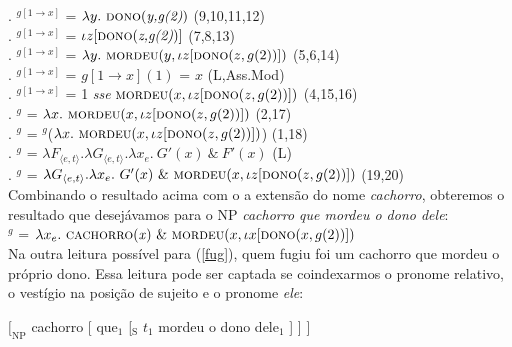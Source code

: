. $^{g[1 \rightarrow x]}$ = $\lambda y.\ \text{\textsc{dono}(\textit{y,g(2)})}$ \hfill (9,10,11,12)\\

. $^{g[1 \rightarrow x]}$ = $\iota z[\text{\textsc{dono}(\textit{z,g(2)})}]$ \hfill (7,8,13)\\

. $^{g[1 \rightarrow x]}$ =
$\lambda y.\ \textsc{mordeu}(y,\iota z[\textsc{dono}(z,g(2))])$ \hfill (5,6,14)\\

. $^{g[1 \rightarrow x]}$ = $g[1 \rightarrow x](1)$ = $x$ \hfill (L,Ass.Mod)\\

. $^{g[1 \rightarrow x]}$ = 1 \textit{sse} $\textsc{mordeu}(x,\iota z[\textsc{dono}(z,g(2))])$ \hfill (4,15,16)\\

. $^{g}$ = $\lambda x.\ \textsc{mordeu}(x,\iota z[\textsc{dono}(z,g(2))])$ \hfill (2,17)\\

. $^{g}$ = $^{g}$($\lambda x.\ \textsc{mordeu}(x,\iota z[\textsc{dono}(z,g(2))])$) \hfill (1,18)\\

. $^{g}$ = $\lambda F_{\langle e,t\rangle}.\lambda
G_{\langle e,t\rangle}.\lambda x_{e}.\ G'(x)\ \&\ F'(x)$
\hfill (L)\\

. $^{g}$ = $\lambda G_{\langle e,t\rangle}.\lambda
x_{e}.\ G'(x)\ \&\ \textsc{mordeu}(x,\iota z[\textsc{dono}(z,g(2))])$
\hfill (19,20)\\

\n Combinando o resultado acima com o a extensão do nome
\textit{cachorro}, obteremos o resultado que desejávamos
para o NP \textit{cachorro que mordeu o dono dele}:\\

\n {}$^{g}$ = $\lambda x_{e}.\ \predica{cachorro}{x}\ \&\ \textsc{mordeu}(x,\iota x[\textsc{dono}(x,g(2))])$\\

\n Na outra leitura possível para (\ref{fug}), quem fugiu foi um
cachorro que mordeu o próprio dono. Essa leitura pode ser
captada se coindexarmos o pronome relativo, o vestígio na
posição de sujeito e o pronome \textit{ele}:

\begin{exe}
    \ex $[_{\text{NP}}$ cachorro [ que$_{1}$ [$_{\text{S}}$ $t_{1}$ mordeu o dono dele$_{1}$ ] ] ]
    \label{coi}
\end{exe}

